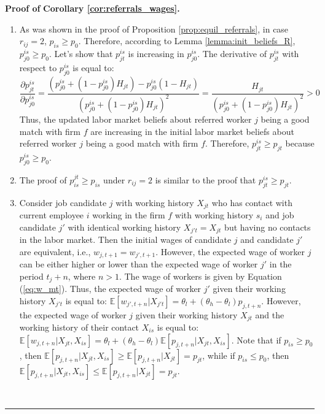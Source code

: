 \documentclass[12pt]{article}
\newenvironment{proof}[1][Proof of]{\noindent\textbf{#1} }{\ \rule{0.5em}{0.5em}}
\begin{document}
\begin{proof}
    \textbf{Corollary \ref{cor:referrals_wages}.}
    \begin{enumerate}[label={\roman*})]
        \item As was shown in the proof of Proposition \ref{prop:equil_referrals}, in case $r_{ij} = 2$, $p_{is} \geq p_0$. Therefore, according to Lemma \ref{lemma:init_beliefs_R}, $p_{j0}^{is} \geq p_0$. Let's show that $p_{jt}^{is}$ is increasing in $p_{j0}^{is}$. The derivative of $p_{jt}^{is}$ with respect to $p_{j0}^{is}$ is equal to:
        \begin{equation*}
            \frac{\partial p_{jt}^{is}}{\partial p_{j0}^{is}} = \frac{\left(p_{j0}^{is} + (1-p_{j0}^{is})H_{jt}\right) - p_{j0}^{is} (1-H_{jt})}{\left( p_{j0}^{is} + (1-p_{j0}^{is})H_{jt}\right)^2} = \frac{H_{jt}}{\left( p_{j0}^{is} + (1-p_{j0}^{is})H_{jt}\right)^2} > 0
        \end{equation*}
        Thus, the updated labor market beliefs about referred worker $j$ being a good match with firm $f$ are increasing in the initial labor market beliefs about referred worker $j$ being a good match with firm $f$. Therefore, $p_{jt}^{is} \geq p_{jt}$ because $p_{j0}^{is} \geq p_0$.
        \item The proof of $p_{is}^{jt} \geq p_{is}$ under $r_{ij} = 2$ is similar to the proof that $p_{jt}^{is} \geq p_{jt}$.
        \item Consider job candidate $j$ with working history $X_{jt}$ who has contact with current employee $i$ working in the firm $f$ with working history $s_i$ and job candidate $j'$ with identical working history $X_{j't} = X_{jt}$ but having no contacts in the labor market. Then the initial wages of candidate $j$ and candidate $j'$ are equivalent, i.e., $w_{j,t+1} = w_{j',t+1}$. However, the expected wage of worker $j$ can be either higher or lower than the expected wage of worker $j'$ in the period $t_j + n$, where $n > 1$. The wage of workers is given by Equation (\ref{eq:w_mt}). Thus, the expected wage of worker $j'$ given their working history $X_{j't}$ is equal to: $\mathbb{E}[w_{j',t+n} | X_{j't}] = \theta_l + (\theta_h - \theta_l)p_{j,t+n}$. However, the expected wage of worker $j$ given their working history $X_{jt}$ and the working history of their contact $X_{is}$ is equal to: $\mathbb{E}[w_{j,t+n} | X_{jt},X_{is}] = \theta_l + (\theta_h - \theta_l)\mathbb{E}[p_{j,t+n} | X_{jt}, X_{is}]$. Note that if $p_{is} \geq p_0$, then $\mathbb{E}[p_{j,t+n} | X_{jt}, X_{is}] \geq \mathbb{E}[p_{j,t+n}|X_{jt}] = p_{jt}$, while if $p_{is} \leq p_0$, then $\mathbb{E}[p_{j,t+n} | X_{jt}, X_{is}] \leq \mathbb{E}[p_{j,t+n}|X_{jt}] = p_{jt}$.
    \end{enumerate}
\end{proof}
\end{document}
